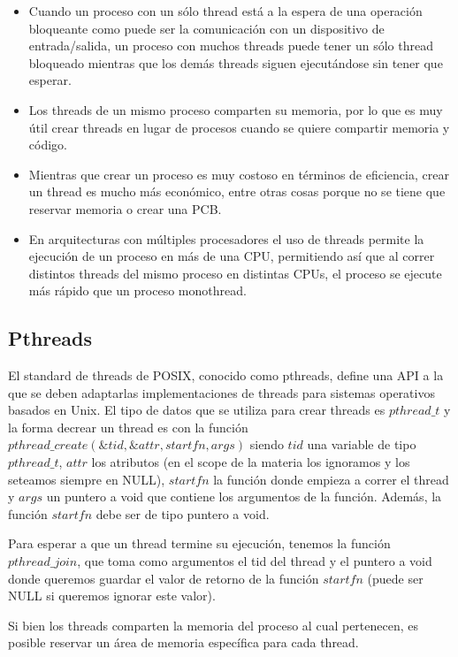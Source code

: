 \documentclass{article}
\begin{document}
\begin{itemize}
\item Cuando un proceso con un s\'olo thread est\'a a la espera de una operaci\'on bloqueante como puede ser la comunicaci\'on con un dispositivo de entrada/salida, un proceso con muchos threads puede tener un s\'olo thread bloqueado mientras que los dem\'as threads siguen ejecut\'andose sin tener que esperar.
\item Los threads de un mismo proceso comparten su memoria, por lo que es muy \'util crear threads en lugar de procesos cuando se quiere compartir memoria y c\'odigo.
\item Mientras que crear un proceso es muy costoso en t\'erminos de eficiencia, crear un thread es mucho m\'as econ\'omico, entre otras cosas porque no se tiene que reservar memoria o crear una PCB.
\item En arquitecturas con m\'ultiples procesadores el uso de threads permite la ejecuci\'on de un proceso en m\'as de una CPU, permitiendo as\'i que al correr distintos threads del mismo proceso en distintas CPUs, el proceso se ejecute m\'as r\'apido que un proceso monothread.
\end{itemize}

\subsection{Pthreads}

El standard de threads de POSIX, conocido como pthreads, define una API a la que se deben adaptarlas implementaciones de threads para sistemas operativos basados en Unix. El tipo de datos que se utiliza para crear threads es $pthread\_t$ y la forma decrear un thread es con la funci\'on $pthread\_create(\&tid,\&attr,startfn,args)$ siendo $tid$ una variable de tipo $pthread\_t$, $attr$ los atributos (en el scope de la materia los ignoramos y los seteamos siempre en NULL), $startfn$ la funci\'on donde empieza a correr el thread y $args$ un puntero a void que contiene los argumentos de la funci\'on. Adem\'as, la funci\'on $startfn$ debe ser de tipo puntero a void.

Para esperar a que un thread termine su ejecuci\'on, tenemos la funci\'on $pthread\_join$, que toma como argumentos el tid del thread y el puntero a void donde queremos guardar el valor de retorno de la funci\'on $startfn$ (puede ser NULL si queremos ignorar este valor).

Si bien los threads comparten la memoria del proceso al cual pertenecen, es posible reservar un \'area de memoria espec\'ifica para cada thread.
\end{document}
